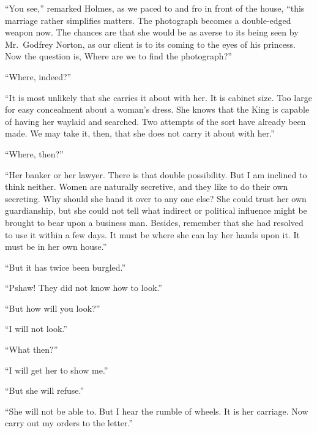 “You see,” remarked Holmes, as we paced to and fro in
front of the house, “this marriage rather simplifies matters.
The photograph becomes a double-edged weapon now. The
chances are that she would be as averse to its being seen by
Mr.~Godfrey Norton, as our client is to its coming to the
eyes of his princess. Now the question is, Where are we to
find the photograph?”

“Where, indeed?”

“It is most unlikely that she carries it about with her. It
is cabinet size. Too large for easy concealment about a
woman’s dress. She knows that the King is capable of having
her waylaid and searched. Two attempts of the sort have
already been made. We may take it, then, that she does not
carry it about with her.”

“Where, then?”

“Her banker or her lawyer. There is that double possibility.
But I am inclined to think neither. Women are
naturally secretive, and they like to do their own secreting.
Why should she hand it over to any one else? She could
trust her own guardianship, but she could not tell what indirect
or political influence might be brought to bear upon a
business man. Besides, remember that she had resolved to
use it within a few days. It must be where she can lay her
hands upon it. It must be in her own house.”

“But it has twice been burgled.”

“Pshaw! They did not know how to look.”

“But how will you look?”

“I will not look.”

“What then?”

“I will get her to show me.”

“But she will refuse.”

“She will not be able to. But I hear the rumble of wheels.
It is her carriage. Now carry out my orders to the letter.”

